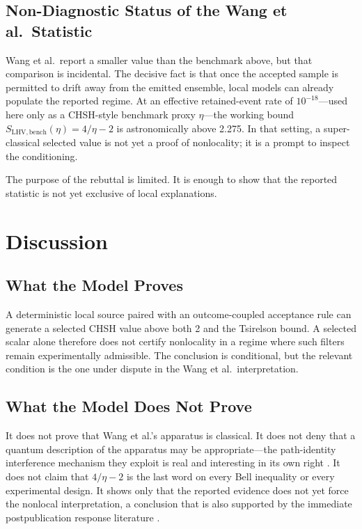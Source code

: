 \documentclass[11pt]{article}
\begin{document}
\subsection{Non-Diagnostic Status of the Wang et al.~Statistic}

Wang et al.~report a smaller value than the benchmark above, but that comparison is incidental. The decisive fact is that once the accepted sample is permitted to drift away from the emitted ensemble, local models can already populate the reported regime. At an effective retained-event rate of $10^{-18}$---used here only as a CHSH-style benchmark proxy $\eta$---the working bound $S_{\mathrm{LHV,bench}}(\eta) = 4/\eta - 2$ is astronomically above 2.275. In that setting, a super-classical selected value is not yet a proof of nonlocality; it is a prompt to inspect the conditioning.

The purpose of the rebuttal is limited. It is enough to show that the reported statistic is not yet exclusive of local explanations.

\section{Discussion}

\subsection{What the Model Proves}

A deterministic local source paired with an outcome-coupled acceptance rule can generate a selected CHSH value above both 2 and the Tsirelson bound. A selected scalar alone therefore does not certify nonlocality in a regime where such filters remain experimentally admissible. The conclusion is conditional, but the relevant condition is the one under dispute in the Wang et al.~interpretation.

\subsection{What the Model Does Not Prove}

It does not prove that Wang et al.'s apparatus is classical. It does not deny that a quantum description of the apparatus may be appropriate---the path-identity interference mechanism they exploit is real and interesting in its own right \cite{zou1991,krenn2017,hochrainer2022}. It does not claim that $4/\eta - 2$ is the last word on every Bell inequality or every experimental design. It shows only that the reported evidence does not yet force the nonlocal interpretation, a conclusion that is also supported by the immediate postpublication response literature \cite{wharton2025,wojcik2025,cieslinski2025}.
\end{document}
